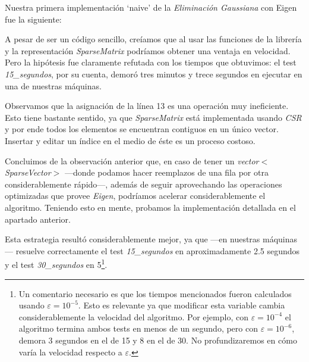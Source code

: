 \vspace{1em}
Nuestra primera implementación `naive' de la \textit{Eliminación Gaussiana} con Eigen fue la siguiente:

\vspace{1em}


\vspace{1em}
A pesar de ser un código sencillo, creíamos que al usar las funciones de la librería y la representación \textit{SparseMatrix} podríamos obtener una ventaja en velocidad. Pero la hipótesis fue claramente refutada con los tiempos que obtuvimos: el test \textit{15\_segundos}, por su cuenta, demoró tres minutos y trece segundos en ejecutar en una de nuestras máquinas.

\vspace{1em}
Observamos que la asignación de la línea 13 es una operación muy ineficiente. Esto tiene bastante sentido, ya que \textit{SparseMatrix} está implementada usando \textit{CSR} y por ende todos los elementos se encuentran contiguos en un único vector. Insertar y editar un índice en el medio de éste es un proceso costoso.
 
\vspace{1em}
Concluimos de la observación anterior que, en caso de tener un \textit{vector$<$SparseVector$>$} ---donde podamos hacer reemplazos de una fila por otra considerablemente rápido---, además de seguir aprovechando las operaciones optimizadas que provee \textit{Eigen}, podríamos acelerar considerablemente el algoritmo. Teniendo esto en mente, probamos la implementación detallada en el apartado anterior.

Esta estrategia resultó considerablemente mejor, ya que ---en nuestras máquinas--- resuelve correctamente el test \textit{15\_segundos} en aproximadamente 2.5 segundos y el test \textit{30\_segundos} en 5\footnote{Un comentario necesario es que los tiempos mencionados fueron calculados usando $\varepsilon = 10^{-5}$. Esto es relevante ya que modificar esta variable cambia considerablemente la velocidad del algoritmo. Por ejemplo, con $\varepsilon = 10^{-4}$ el algoritmo termina ambos tests en menos de un segundo, pero con $\varepsilon = 10^{-6}$, demora 3 segundos en el de 15 y 8 en el de 30. No profundizaremos en cómo varía la velocidad respecto a $\varepsilon$.
}.


